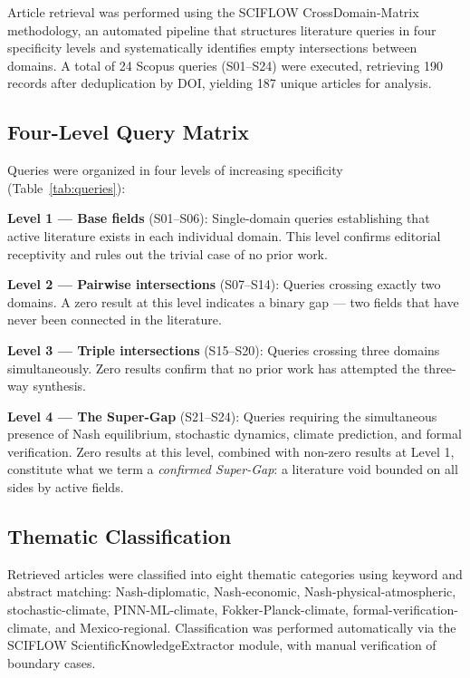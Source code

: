 \documentclass[12pt,a4paper]{article}
\begin{document}
Article retrieval was performed using the SCIFLOW CrossDomain-Matrix
methodology, an automated pipeline that structures literature queries in
four specificity levels and systematically identifies empty intersections
between domains. A total of 24 Scopus queries (S01--S24) were executed,
retrieving 190 records after deduplication by DOI, yielding 187 unique
articles for analysis.

\subsection{Four-Level Query Matrix}

Queries were organized in four levels of increasing specificity
(Table~\ref{tab:queries}):

\textbf{Level 1 — Base fields} (S01--S06): Single-domain queries
establishing that active literature exists in each individual domain.
This level confirms editorial receptivity and rules out the trivial
case of no prior work.

\textbf{Level 2 — Pairwise intersections} (S07--S14): Queries crossing
exactly two domains. A zero result at this level indicates a binary gap
— two fields that have never been connected in the literature.

\textbf{Level 3 — Triple intersections} (S15--S20): Queries crossing
three domains simultaneously. Zero results confirm that no prior work
has attempted the three-way synthesis.

\textbf{Level 4 — The Super-Gap} (S21--S24): Queries requiring the
simultaneous presence of Nash equilibrium, stochastic dynamics, climate
prediction, and formal verification. Zero results at this level, combined
with non-zero results at Level 1, constitute what we term a
\textit{confirmed Super-Gap}: a literature void bounded on all sides
by active fields.

\subsection{Thematic Classification}

Retrieved articles were classified into eight thematic categories using
keyword and abstract matching: Nash-diplomatic, Nash-economic,
Nash-physical-atmospheric, stochastic-climate, PINN-ML-climate,
Fokker-Planck-climate, formal-verification-climate, and Mexico-regional.
Classification was performed automatically via the SCIFLOW
ScientificKnowledgeExtractor module, with manual verification of
boundary cases.
\end{document}
